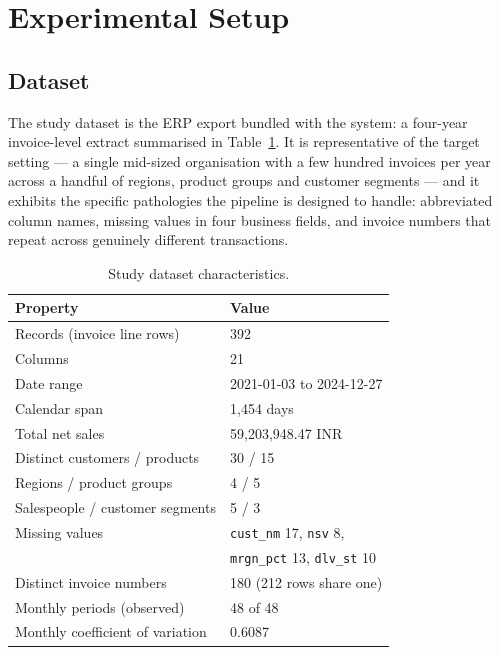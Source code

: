 \documentclass[conference]{IEEEtran}
\begin{document}
\section{Experimental Setup}
\label{sec:setup}

\subsection{Dataset}

The study dataset is the ERP export bundled with the system: a four-year
invoice-level extract summarised in Table~\ref{tab:dataset}. It is
representative of the target setting --- a single mid-sized organisation with a
few hundred invoices per year across a handful of regions, product groups and
customer segments --- and it exhibits the specific pathologies the pipeline is
designed to handle: abbreviated column names, missing values in four business
fields, and invoice numbers that repeat across genuinely different
transactions.

\begin{table}[!t]
\caption{Study dataset characteristics.}
\label{tab:dataset}
\centering
\footnotesize
\begin{tabular}{@{}ll@{}}
\toprule
Property & Value \\
\midrule
Records (invoice line rows)      & 392 \\
Columns                          & 21 \\
Date range                       & 2021-01-03 to 2024-12-27 \\
Calendar span                    & 1{,}454 days \\
Total net sales                  & 59{,}203{,}948.47 INR \\
Distinct customers / products    & 30 / 15 \\
Regions / product groups         & 4 / 5 \\
Salespeople / customer segments  & 5 / 3 \\
Missing values                   & \texttt{cust\_nm} 17, \texttt{nsv} 8, \\
                                 & \texttt{mrgn\_pct} 13, \texttt{dlv\_st} 10 \\
Distinct invoice numbers         & 180 (212 rows share one) \\
Monthly periods (observed)       & 48 of 48 \\
Monthly coefficient of variation & 0.6087 \\
\bottomrule
\end{tabular}
\end{table}
\end{document}
